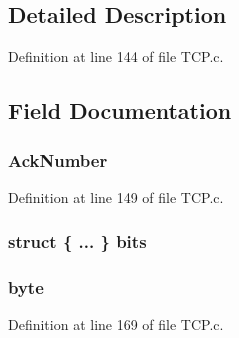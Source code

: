 \subsection{Detailed Description}


Definition at line 144 of file T\+C\+P.\+c.



\subsection{Field Documentation}
\hypertarget{struct_t_c_p___h_e_a_d_e_r_abc8c237ba79d8186d8cb3de7df3a131a}{}
\subsubsection[{Ack\+Number}]{ Ack\+Number}\label{struct_t_c_p___h_e_a_d_e_r_abc8c237ba79d8186d8cb3de7df3a131a}


Definition at line 149 of file T\+C\+P.\+c.

\hypertarget{struct_t_c_p___h_e_a_d_e_r_a3ed294cd22f01bf2937a879fe3e73bfc}{}
\subsubsection[{bits}]{\setlength{\rightskip}{0pt plus 5cm}struct \{ ... \}   bits}\label{struct_t_c_p___h_e_a_d_e_r_a3ed294cd22f01bf2937a879fe3e73bfc}
\hypertarget{struct_t_c_p___h_e_a_d_e_r_a4ec262e8432e722273b67cea923f72a6}{}
\subsubsection[{byte}]{ byte}\label{struct_t_c_p___h_e_a_d_e_r_a4ec262e8432e722273b67cea923f72a6}


Definition at line 169 of file T\+C\+P.\+c.

\hypertarget{struct_t_c_p___h_e_a_d_e_r_a85011e0b7801556de62f34a465135806}{}
